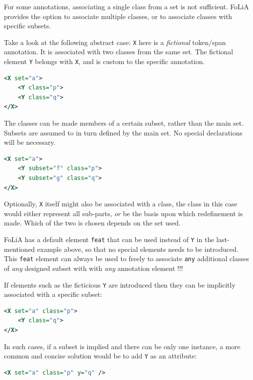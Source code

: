 \documentclass[a4paper,12pt]{report}
\begin{document}
For some annotations, associating a single class from a set is not sufficient. FoLiA provides the option to associate multiple classes, or to associate classes with specific subsets. 


Take a look at the following abstract case: \texttt{X} here is a \emph{fictional} token/span annotation. It is associated with two classes from the same set. The fictional element \texttt{Y} belongs with \texttt{X}, and is custom to the specific annotation.

\begin{lstlisting}[language=xml]
<X set="a">
    <Y class="p">
    <Y class="q">
</X>
\end{lstlisting}

The classes can be made members of a certain subset, rather than the main set. Subsets are assumed to in turn defined by the main set. No special declarations will be necessary.

\begin{lstlisting}[language=xml]
<X set="a">
    <Y subset="f" class="p">
    <Y subset="g" class="q">
</X>
\end{lstlisting}

Optionally, \texttt{X} itself might also be associated with a class, the class in this case would either represent all sub-parts, \emph{or} be the basis upon which redefinement is made. Which of the two is chosen depends on the set used.

FoLiA has a default element \texttt{feat} that can be used instead of \texttt{Y} in the last-mentioned example above, so that no special elements needs to be introduced. This \texttt{feat} element can always be used to freely to associate \texttt{any} additional classes of \emph{any} designed subset with with \emph{any} annotation element !!!

If elements such as the ficticious \texttt{Y} are introduced then they can be implicitly associated with a specific subset:

\begin{lstlisting}[language=xml]
<X set="a" class="p">
    <Y class="q">
</X>
\end{lstlisting}

In such cases, if a subset is implied and there can be only one instance, a more common and concise solution would be to add \texttt{Y} as an attribute:

\begin{lstlisting}[language=xml]
<X set="a" class="p" y="q" />
\end{lstlisting}
\end{document}
